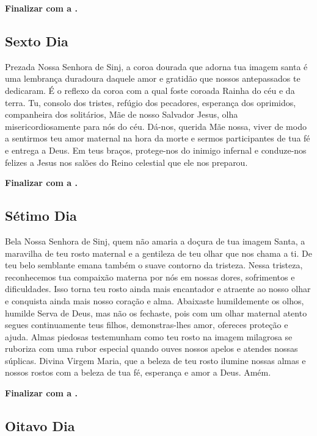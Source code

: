 \documentclass[a4paper,14pt]{extarticle} \usepackage[utf8]{inputenc}
\begin{document}
\noindent
\textbf{Finalizar com a .}


\subsection{Sexto Dia}

Prezada Nossa Senhora de Sinj, a coroa dourada que adorna tua imagem santa é uma lembrança duradoura daquele amor e gratidão que nossos antepassados te dedicaram. É o reflexo da coroa com a qual foste coroada Rainha do céu e da terra. Tu, consolo dos tristes, refúgio dos pecadores, esperança dos oprimidos, companheira dos solitários, Mãe de nosso Salvador Jesus, olha misericordiosamente para nós do céu. Dá-nos, querida Mãe nossa, viver de modo a sentirmos teu amor maternal na hora da morte e sermos participantes de tua fé e entrega a Deus. Em teus braços, protege-nos do inimigo infernal e conduze-nos felizes a Jesus nos salões do Reino celestial que ele nos preparou.

\noindent
\textbf{Finalizar com a .}


\subsection{Sétimo Dia}

Bela Nossa Senhora de Sinj, quem não amaria a doçura de tua imagem Santa, a maravilha de teu rosto maternal e a gentileza de teu olhar que nos chama a ti. De teu belo semblante emana também o suave contorno da tristeza. Nessa tristeza, reconhecemos tua compaixão materna por nós em nossas dores, sofrimentos e dificuldades. Isso torna teu rosto ainda mais encantador e atraente ao nosso olhar e conquista ainda mais nosso coração e alma. Abaixaste humildemente os olhos, humilde Serva de Deus, mas não os fechaste, pois com um olhar maternal atento segues continuamente teus filhos, demonstras-lhes amor, ofereces proteção e ajuda. Almas piedosas testemunham como teu rosto na imagem milagrosa se ruboriza com uma rubor especial quando ouves nossos apelos e atendes nossas súplicas. Divina Virgem Maria, que a beleza de teu rosto ilumine nossas almas e nossos rostos com a beleza de tua fé, esperança e amor a Deus.
Amém.

\noindent
\textbf{Finalizar com a .}


\subsection{Oitavo Dia}
\end{document}
